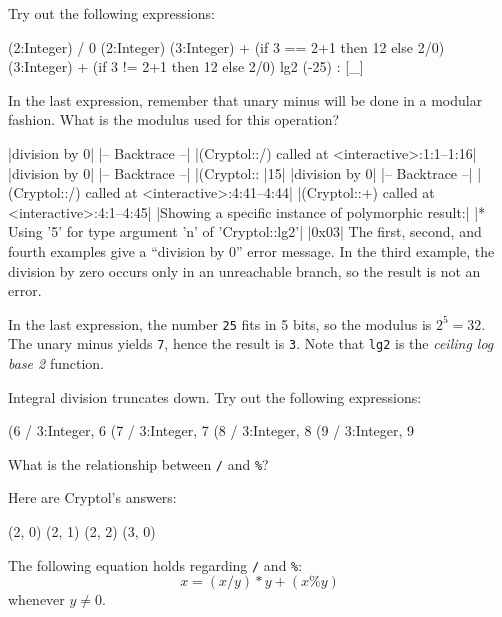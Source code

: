 \restartrepl
\begin{Exercise}\label{ex:arith:4}
Try out the following expressions:\indEq\indNeq
\begin{replinVerb}
  (2:Integer) / 0
  (2:Integer) %
  (3:Integer) + (if 3 == 2+1 then 12 else 2/0)
  (3:Integer) + (if 3 != 2+1 then 12 else 2/0)
  lg2 (-25) : [_]
\end{replinVerb}
In the last expression, remember that unary minus will\indUnaryMinus
be done in a modular fashion. What is the modulus used for this
operation?
\end{Exercise}
\begin{Answer}
  \hidereplout|division by 0|
  \hidereplout|-- Backtrace --|
  \hidereplout|(Cryptol::/) called at <interactive>:1:1--1:16|
  \hidereplout|division by 0|
  \hidereplout|-- Backtrace --|
  \hidereplout|(Cryptol::%
  \hidereplout|15|
  \hidereplout|division by 0|
  \hidereplout|-- Backtrace --|
  \hidereplout|(Cryptol::/) called at <interactive>:4:41--4:44|
  \hidereplout|(Cryptol::+) called at <interactive>:4:1--4:45|
  \hidereplout|Showing a specific instance of polymorphic result:|
  \hidereplout|* Using '5' for type argument 'n' of 'Cryptol::lg2'|
  \hidereplout|0x03|
  The first, second, and fourth examples give a ``division by 0''
  error message. In the third example, the division by zero occurs
  only in an unreachable branch, so the result is not an error.

  In the last expression, the number \texttt{25} fits in 5 bits, so
  the modulus is $2^5 = 32$. The unary minus yields \texttt{7}, hence
  the result is \texttt{3}. Note that \texttt{lg2} is the
  \emph{ceiling log base 2} function.\indLg\indEq\indNeq
\end{Answer}

\restartrepl
\begin{Exercise}\label{ex:arith:5:1}
Integral division truncates down. Try out the following expressions:\indDiv\indMod
\begin{replinVerb}
  (6 / 3:Integer, 6 %
  (7 / 3:Integer, 7 %
  (8 / 3:Integer, 8 %
  (9 / 3:Integer, 9 %
\end{replinVerb}
What is the relationship between {\tt /} and {\tt \%}?
\end{Exercise}
\begin{Answer}
Here are Cryptol's answers:\indDiv\indMod
\begin{reploutVerb}
  (2, 0)
  (2, 1)
  (2, 2)
  (3, 0)
\end{reploutVerb}
The following equation holds regarding {\tt /} and {\tt \%}:
$$
  x = (x / y) * y + (x \% y)
$$
whenever $y \neq 0$.
\end{Answer}

